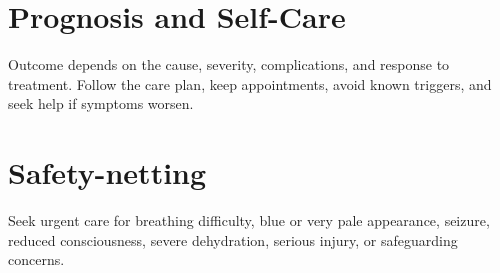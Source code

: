 \section*{Prognosis and Self-Care}
Outcome depends on the cause, severity, complications, and response to treatment. Follow the care plan, keep appointments, avoid known triggers, and seek help if symptoms worsen.
\section*{Safety-netting}
Seek urgent care for breathing difficulty, blue or very pale appearance, seizure, reduced consciousness, severe dehydration, serious injury, or safeguarding concerns.
